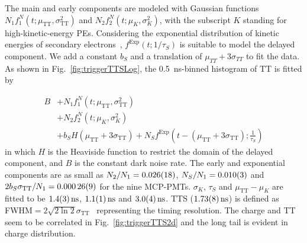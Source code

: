 The main and early components are modeled with Gaussian functions %
$N_1f_1^N(t;\mu_{\mathrm{TT}},\sigma_{\mathrm{TT}}^2)$ and $N_2f_2^N(t;\mu_K,\sigma_K^2)$, with the subscript $K$ standing for high-kinetic-energy PEs. Considering the exponential distribution of kinetic energies of secondary electrons~\cite{Furman,SecondElectron}, $f^\mathrm{Exp}(t;1/\tau_S)$ is suitable to model the delayed component.  We add a constant $b_S$ and a translation of $\mu_{TT} + 3\sigma_{TT}$ to fit the data. As shown in Fig.~\ref{fig:triggerTTSLog}, the \SI{0.5}{ns}-binned histogram of $\mathrm{TT}$ is fitted by

\begin{equation}
    \begin{aligned}
        B&+N_1f_1^N(t;\mu_{\mathrm{TT}},\sigma_{\mathrm{TT}}^2)\\
        &+N_2f_2^N(t;\mu_K,\sigma_K^2)\\
        &+b_SH(\mu_{\mathrm{TT}}+3\sigma_{\mathrm{TT}})+N_Sf^{\mathrm{Exp}}\left(t-(\mu_{\mathrm{TT}}+3\sigma_{\mathrm{TT}});\frac{1}{\tau_S}\right)
    \end{aligned}
\end{equation}
in which $H$ is the Heaviside function to restrict the domain of the delayed component, and $B$ is the constant dark noise rate. The early and exponential components are as small as $N_2/N_1 = \num{0.026\pm0.018}$, $N_S/N_1 = \num{0.010\pm0.003}$ and $2b_S\sigma_{\mathrm{TT}}/N_1 = \num{0.00026\pm0.00009}$ for the nine MCP-PMTs.  $\sigma_K$, $\tau_S$ and $\mu_{\mathrm{TT}}-\mu_K$ are fitted to be $\SI{1.4 \pm 0.3}{ns}$, $\SI{1.1\pm 0.1}{ns}$ and $\SI{3.0\pm 0.4}{ns}$. TTS ($\SI{1.73\pm0.08}{ns}$) is defined as FWHM$=2\sqrt{2\ln 2}\sigma_{\mathrm{TT}}$~\cite{HAMAMATSUManual} representing the timing resolution. The charge and TT seem to be correlated in Fig.~\ref{fig:triggerTTS2d} and the long tail is evident in charge distribution.

